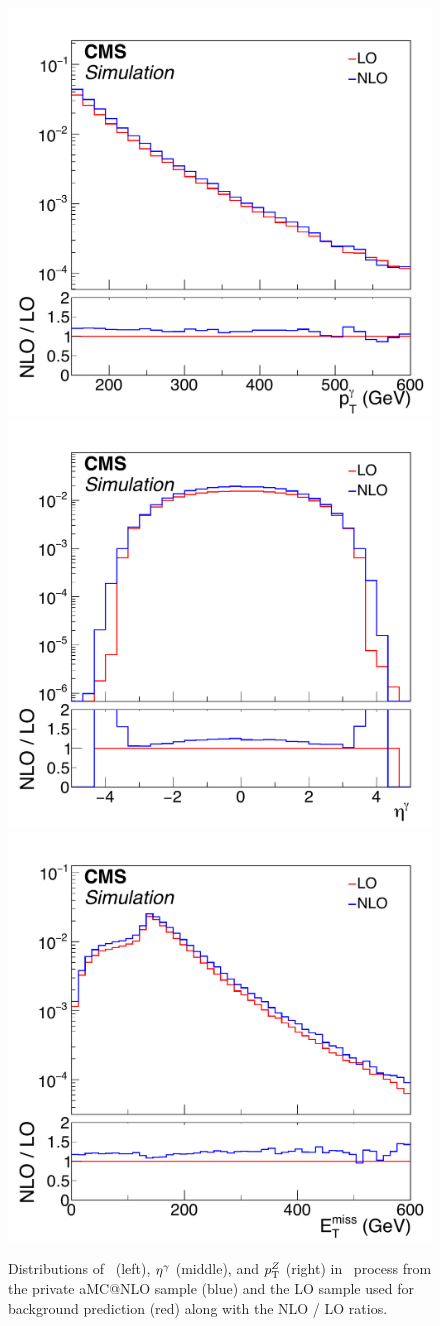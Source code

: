 \begin{figure}[htbp]
  \centering
  \includegraphics[width=0.32\linewidth]{Analysis/Figures/kfactor/ZG_ptg.pdf}
  \includegraphics[width=0.32\linewidth]{Analysis/Figures/kfactor/ZG_etag.pdf}
  \includegraphics[width=0.32\linewidth]{Analysis/Figures/kfactor/ZG_met.pdf}
  \caption{
    Distributions of \ETg\ (left), $\eta^{\gamma}$ (middle), and $p_{\mathrm{T}}^{{Z}}$ (right) in \zinvg\ process from the private aMC@NLO sample (blue) and the LO sample used for background prediction (red) along with the NLO / LO ratios.
  }
  \label{fig:zg_nlo_lo}
\end{figure}
